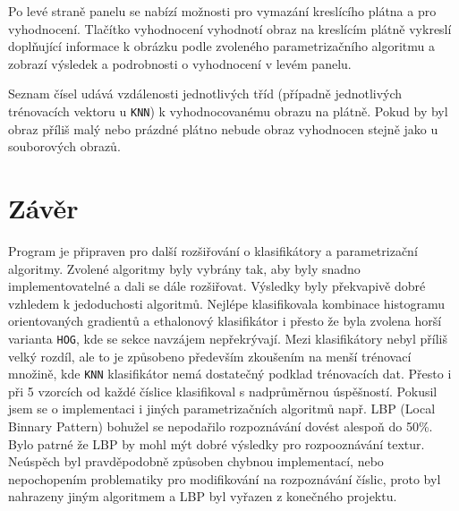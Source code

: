 \documentclass[12pt]{article}
\begin{document}
Po levé straně panelu se nabízí možnosti pro vymazání kreslícího plátna a pro vyhodnocení. Tlačítko vyhodnocení vyhodnotí obraz na kreslícím plátně vykreslí doplňující informace k obrázku podle zvoleného parametrizačního algoritmu a zobrazí výsledek a podrobnosti o vyhodnocení v levém panelu.

Seznam čísel udává vzdálenosti jednotlivých tříd (případně jednotlivých trénovacích vektoru u \texttt{KNN}) k vyhodnocovanému obrazu na plátně. Pokud by byl obraz příliš malý nebo prázdné plátno nebude obraz vyhodnocen stejně jako u souborových obrazů.

\pagebreak

\section{Závěr}
Program je připraven pro další rozšiřování o klasifikátory a parametrizační algoritmy. Zvolené algoritmy byly vybrány tak, aby byly snadno implementovatelné a dali se dále rozšiřovat. Výsledky byly překvapivě dobré vzhledem k jedoduchosti algoritmů. Nejlépe klasifikovala kombinace histogramu orientovaných gradientů a ethalonový klasifikátor i přesto že byla zvolena horší varianta \texttt{HOG}, kde se sekce navzájem nepřekrývají. Mezi klasifikátory nebyl příliš velký rozdíl, ale to je způsobeno především zkoušením na menší trénovací množině, kde \texttt{KNN} klasifikátor nemá dostatečný podklad trénovacích dat. Přesto i při 5 vzorcích od každé číslice klasifikoval s nadprůměrnou úspěšností. Pokusil jsem se o implementaci i jiných parametrizačních algoritmů např. LBP (Local Binnary Pattern) bohužel se nepodařilo rozpoznávání dovést alespoň do 50\%. Bylo patrné že LBP by mohl mýt dobré výsledky pro rozpooznávání textur. Neúspěch byl pravděpodobně způsoben chybnou implementací, nebo nepochopením problematiky pro modifikování na rozpoznávání číslic, proto byl nahrazeny jiným algoritmem a LBP byl vyřazen z konečného projektu. 

\vspace{0.5cm}
\end{document}
